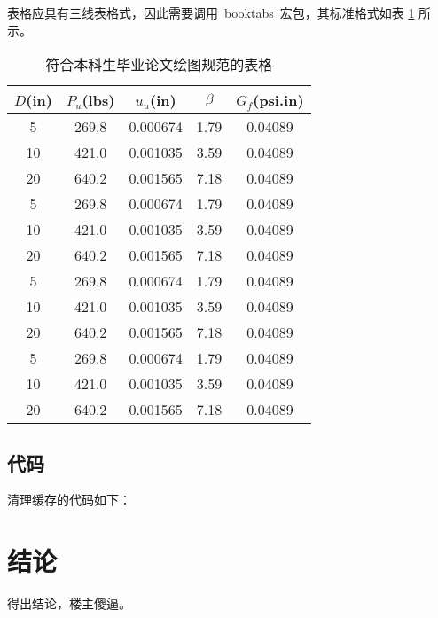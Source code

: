 表格应具有三线表格式，因此需要调用~booktabs~宏包，其标准格式如表 \ref{tab:table1} 所示。
\begin{table}[htbp]
\caption{符合本科生毕业论文绘图规范的表格}\label{tab:table1}
\vspace{0.5em}\centering\wuhao
\begin{tabular}{ccccc}
\toprule[1.5pt]
$D$(in) & $P_u$(lbs) & $u_u$(in) & $\beta$ & $G_f$(psi.in)\\
\midrule[1pt]
 5 & 269.8 & 0.000674 & 1.79 & 0.04089\\
10 & 421.0 & 0.001035 & 3.59 & 0.04089\\
20 & 640.2 & 0.001565 & 7.18 & 0.04089\\
 5 & 269.8 & 0.000674 & 1.79 & 0.04089\\
10 & 421.0 & 0.001035 & 3.59 & 0.04089\\
20 & 640.2 & 0.001565 & 7.18 & 0.04089\\
 5 & 269.8 & 0.000674 & 1.79 & 0.04089\\
10 & 421.0 & 0.001035 & 3.59 & 0.04089\\
20 & 640.2 & 0.001565 & 7.18 & 0.04089\\
 5 & 269.8 & 0.000674 & 1.79 & 0.04089\\
10 & 421.0 & 0.001035 & 3.59 & 0.04089\\
20 & 640.2 & 0.001565 & 7.18 & 0.04089\\
\bottomrule[1.5pt]
\end{tabular}
\vspace{\baselineskip}
\end{table}

\section{代码}

清理缓存的代码如下：




\chapter*{结\quad 论}

得出结论，楼主傻逼。
